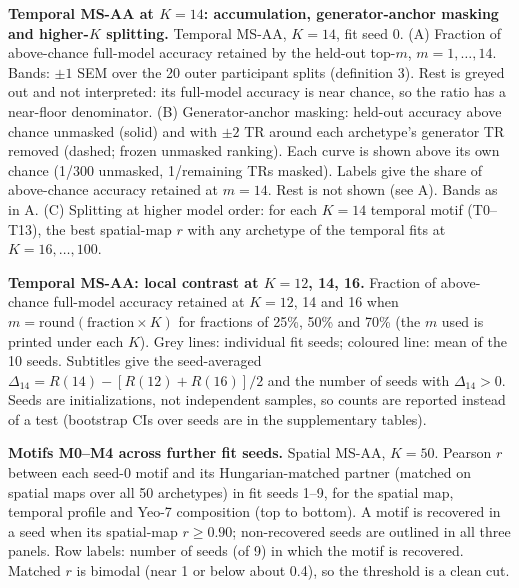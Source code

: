 \caption{\textbf{Temporal MS-AA at $K = 14$: accumulation, generator-anchor masking and higher-$K$ splitting.}
Temporal MS-AA, $K = 14$, fit seed 0. (A) Fraction of above-chance full-model accuracy retained by the held-out top-$m$, $m = 1, \ldots, 14$. Bands: $\pm 1$ SEM over the 20 outer participant splits (definition 3). Rest is greyed out and not interpreted: its full-model accuracy is near chance, so the ratio has a near-floor denominator. (B) Generator-anchor masking: held-out accuracy above chance unmasked (solid) and with $\pm 2$ TR around each archetype's generator TR removed (dashed; frozen unmasked ranking). Each curve is shown above its own chance (1/300 unmasked, 1/remaining TRs masked). Labels give the share of above-chance accuracy retained at $m = 14$. Rest is not shown (see A). Bands as in A. (C) Splitting at higher model order: for each $K = 14$ temporal motif (T0--T13), the best spatial-map $r$ with any archetype of the temporal fits at $K = 16, \ldots, 100$.}
\label{fig:s02}

\caption{\textbf{Temporal MS-AA: local contrast at $K = 12$, 14, 16.}
Fraction of above-chance full-model accuracy retained at $K = 12$, 14 and 16 when $m = \mathrm{round}(\text{fraction} \times K)$ for fractions of 25\%, 50\% and 70\% (the $m$ used is printed under each $K$). Grey lines: individual fit seeds; coloured line: mean of the 10 seeds. Subtitles give the seed-averaged $\Delta_{14} = R(14) - [R(12) + R(16)]/2$ and the number of seeds with $\Delta_{14} > 0$. Seeds are initializations, not independent samples, so counts are reported instead of a test (bootstrap CIs over seeds are in the supplementary tables).}
\label{fig:s03}

\caption{\textbf{Motifs M0--M4 across further fit seeds.}
Spatial MS-AA, $K = 50$. Pearson $r$ between each seed-0 motif and its Hungarian-matched partner (matched on spatial maps over all 50 archetypes) in fit seeds 1--9, for the spatial map, temporal profile and Yeo-7 composition (top to bottom). A motif is recovered in a seed when its spatial-map $r \geq 0.90$; non-recovered seeds are outlined in all three panels. Row labels: number of seeds (of 9) in which the motif is recovered. Matched $r$ is bimodal (near 1 or below about 0.4), so the threshold is a clean cut.}
\label{fig:s04}

